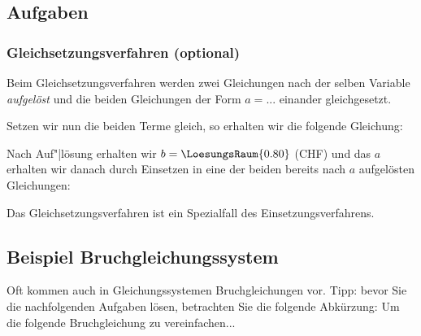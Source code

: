 \subsection*{Aufgaben}

\newpage


\subsubsection{Gleichsetzungsverfahren (optional)}\label{lin_gl_gleichsetzungsverfahren}
Beim Gleichsetzungsverfahren werden zwei Gleichungen nach der selben Variable \textit{aufgelöst} und die beiden Gleichungen der Form $a = ...$ einander gleichgesetzt.

\vspace{22mm}

Setzen wir nun die beiden Terme gleich, so erhalten wir die
folgende Gleichung:


Nach Auf"|lösung erhalten wir $b=\LoesungsRaum{0.80}$ (CHF) und das
$a$ erhalten wir danach durch Einsetzen in eine der beiden bereits
nach $a$ aufgelösten Gleichungen:

Das Gleichsetzungsverfahren ist ein Spezialfall des
Einsetzungsverfahrens.
\newpage

\GESO{}
\newpage

\subsection{Beispiel Bruchgleichungssystem}
Oft kommen auch in Gleichungssystemen Bruchgleichungen vor. Tipp:
bevor Sie die nachfolgenden Aufgaben lösen, betrachten Sie die folgende
Abkürzung: Um die folgende Bruchgleichung zu vereinfachen...

